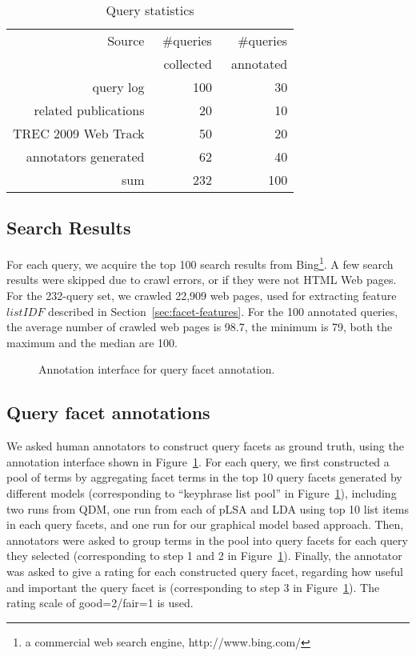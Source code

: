 \begin{table}[ht!]
\vspace{-3mm}
\centering
\caption{Query statistics}
\label{tab:queries}
\begin{tabular}{|r|r|r|} \hline
Source& \#queries& \#queries \\ 
& \ collected& \  annotated\\ \hline
query log & 100 & 30\\ 
related publications & 20 & 10\\ 
TREC 2009 Web Track & 50 & 20\\ 
annotators generated & 62 & 40\\ \hline
sum & 232 & 100\\ \hline
\end{tabular}
\end{table}	

\subsection{Search Results}
For each query, we acquire the top 100 search results from Bing\footnote{a commercial web search engine, http://www.bing.com/}. 
A few search results were skipped due to crawl errors, or if they were not HTML Web pages.
For the 232-query set, we crawled 22,909 web pages, used for extracting feature $listIDF$ described in Section~\ref{sec:facet-features}. For the 100 annotated queries, the average number of crawled web pages is 98.7, the minimum is 79, both the maximum and the median are 100.

\begin{figure}[ht!]
\centering
{}
\caption{Annotation interface for query facet annotation.}
\label{fig:facet-annotation}
\end{figure}

\subsection{Query facet annotations}
We asked human annotators to construct query facets as ground truth, using the annotation interface shown in Figure~\ref{fig:facet-annotation}.
For each query, we first constructed a pool of terms by aggregating facet terms in the top 10 query facets generated by different models (corresponding to ``keyphrase list pool'' in Figure~\ref{fig:facet-annotation}), including two runs from QDM, one run from each of pLSA and LDA using top 10 list items in each query facets, and one run for our graphical model based approach. 
Then, annotators were asked to group terms in the pool into query facets for each query they selected (corresponding to step 1 and 2 in Figure~\ref{fig:facet-annotation}).
Finally, the annotator was asked to give a rating for each constructed query facet, regarding how useful and important the query facet is (corresponding to step 3 in Figure~\ref{fig:facet-annotation}). The rating scale of good=2/fair=1 is used. 

